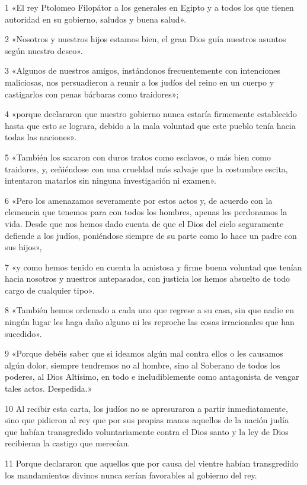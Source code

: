 \par 1 «El rey Ptolomeo Filopátor a los generales en Egipto y a todos los que tienen autoridad en su gobierno, saludos y buena salud».
\par 2 «Nosotros y nuestros hijos estamos bien, el gran Dios guía nuestros asuntos según nuestro deseo».
\par 3 «Algunos de nuestros amigos, instándonos frecuentemente con intenciones maliciosas, nos persuadieron a reunir a los judíos del reino en un cuerpo y castigarlos con penas bárbaras como traidores»;
\par 4 «porque declararon que nuestro gobierno nunca estaría firmemente establecido hasta que esto se lograra, debido a la mala voluntad que este pueblo tenía hacia todas las naciones».
\par 5 «También los sacaron con duros tratos como esclavos, o más bien como traidores, y, ceñiéndose con una crueldad más salvaje que la costumbre escita, intentaron matarlos sin ninguna investigación ni examen».
\par 6 «Pero los amenazamos severamente por estos actos y, de acuerdo con la clemencia que tenemos para con todos los hombres, apenas les perdonamos la vida. Desde que nos hemos dado cuenta de que el Dios del cielo seguramente defiende a los judíos, poniéndose siempre de su parte como lo hace un padre con sus hijos»,
\par 7 «y como hemos tenido en cuenta la amistosa y firme buena voluntad que tenían hacia nosotros y nuestros antepasados, con justicia los hemos absuelto de todo cargo de cualquier tipo».
\par 8 «También hemos ordenado a cada uno que regrese a su casa, sin que nadie en ningún lugar les haga daño alguno ni les reproche las cosas irracionales que han sucedido».
\par 9 «Porque debéis saber que si ideamos algún mal contra ellos o les causamos algún dolor, siempre tendremos no al hombre, sino al Soberano de todos los poderes, al Dios Altísimo, en todo e ineludiblemente como antagonista de vengar tales actos. Despedida.»
\par 10 Al recibir esta carta, los judíos no se apresuraron a partir inmediatamente, sino que pidieron al rey que por sus propias manos aquellos de la nación judía que habían transgredido voluntariamente contra el Dios santo y la ley de Dios recibieran la castigo que merecían.
\par 11 Porque declararon que aquellos que por causa del vientre habían transgredido los mandamientos divinos nunca serían favorables al gobierno del rey.

